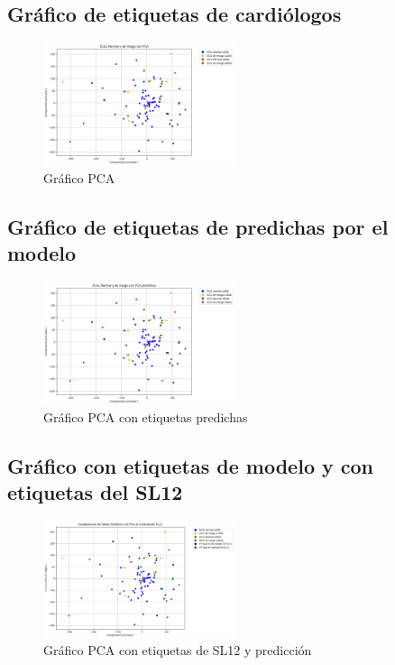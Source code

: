 \documentclass[conference]{IEEEtran}
\begin{document}
\subsection{Gráfico de etiquetas de cardiólogos}
\begin{figure}[H]
    \includegraphics[width=0.5\textwidth]{./graficos/graficoPCA.png}
    \caption{Gráfico PCA}
\end{figure}

\subsection{Gráfico de etiquetas de predichas por el modelo}
\begin{figure}[H]
    \includegraphics[width=0.5\textwidth]{./graficos/graficoPCAPredicho.png}
    \caption{Gráfico PCA con etiquetas predichas}
\end{figure}

\subsection{Gráfico con etiquetas de modelo y con etiquetas del SL12}
\begin{figure}[H]
    \includegraphics[width=0.5\textwidth]{./graficos/graficoPCAPredichoComparacion.png}
    \caption{Gráfico PCA con etiquetas de SL12 y predicción}
\end{figure}
\end{document}
